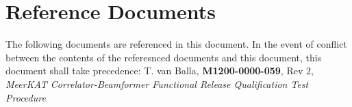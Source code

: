 \section{Reference Documents}
The following documents are referenced in this document. In the event of conflict between the contents of the referesnced documents and this document, this document shall take precedence:\newline\newline
[2]\hspace{10mm} T. van Balla, {\bf M1200-0000-059}, Rev 2, {\it MeerKAT Correlator-Beamformer Functional Release Qualification Test Procedure}\newline

